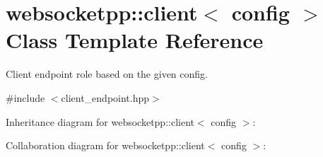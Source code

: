 \hypertarget{classwebsocketpp_1_1client}{}\section{websocketpp\+:\+:client$<$ config $>$ Class Template Reference}
\label{classwebsocketpp_1_1client}


Client endpoint role based on the given config.  




{\ttfamily \#include $<$client\+\_\+endpoint.\+hpp$>$}



Inheritance diagram for websocketpp\+:\+:client$<$ config $>$\+:


Collaboration diagram for websocketpp\+:\+:client$<$ config $>$\+:
